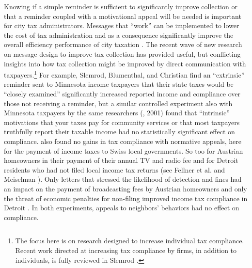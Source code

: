 \documentclass[12pt]{article}
\begin{document}
Knowing if a  simple reminder is sufficient to significantly improve collection or that a reminder coupled with
a motivational appeal will be needed is important for city tax administrators. Messages that ``work'' can be implemented
to lower the cost of tax administration and as a consequence significantly improve the overall efficiency performance of
city taxation \cite{keen2016optimal}. The recent wave of new research on message design to improve
tax collection has provided useful, but conflicting insights into how tax collection might be improved by direct
communication with taxpayers.\footnote{The focus here is on research designed to increase individual tax compliance. Recent work
directed at increasing tax compliance by firms, in addition to individuals, is fully reviewed in Slemrod \citeyear{slemrod2017}.}
For example, Slemrod, Blumenthal, and Christian \citeyear{slemrod2001taxpayer} find an ``extrinsic'' reminder sent to Minnesota income
taxpayers that their state taxes would be ``closely examined'' significantly increased reported income and compliance over those not receiving a reminder, but a similar controlled experiment also with Minnesota taxpayers by the same researchers (\citeauthor{Blumenthal-01}, 2001) found that ``intrinsic'' motivations that your taxes pay for community services or that most taxpayers truthfully report their taxable income had no statistically significant effect on compliance. \citeauthor{torgler2004moral} \citeyear{torgler2004moral} also found no gains in tax compliance with normative appeals, here for the payment  of income taxes to Swiss local governments. So too for Austrian homeowners in their payment of their annual TV and radio fee and for Detroit residents who had not filed local income tax returns (see Fellner et al. \citeyear{Fellner-13} and Meiselman \citeyear{meiselman2017ghostbusting}). Only letters that stressed the likelihood of detection and fines had an impact on the payment of broadcasting fees by Austrian homeowners \cite{Fellner-13} and only the threat of economic penalties for non-filing improved income tax compliance in Detroit \cite{meiselman2017ghostbusting}. In both experiments, appeals to neighbors' behaviors had no effect on compliance.
\end{document}
